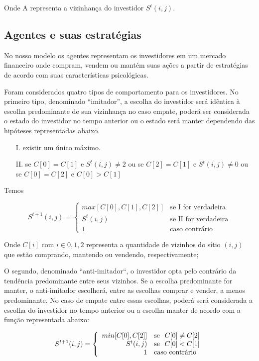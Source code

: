 \documentclass[brazil,ruledheader]{abnt}
\begin{document}
Onde A representa a vizinhança do investidor $S^t(i,j)$.

\subsection{Agentes e suas estratégias}

No nosso modelo os agentes representam os investidores em um mercado financeiro
onde compram, vendem ou mantém suas ações a partir de estratégias de acordo com
suas características psicológicas.

Foram considerados quatro tipos de comportamento para os investidores. No
primeiro tipo, denominado ``imitador'', a escolha do investidor será idêntica
à escolha predominante de sua vizinhança no caso empate, poderá ser
considerada o estado do investidor no tempo anterior ou o estado será 
manter dependendo das hipóteses representadas abaixo.

\begin{enumerate}
 \item[I.] existir um único máximo. 

\item[II.] se $C[0]=C[1]$ e $S^t(i,j)\neq 2$ ou se $C[2]=C[1]$ e $S^t(i,j)\neq
0$ ou se $C[0]=C[2]$ e $C[0]>C[1]$
\end{enumerate}

Temos

\begin{equation}
S^{t+1}(i,j)=\left\{ \begin{array}{rl}
max[C[0],C[1],C[2]] & \mbox{se I for verdadeira} \\
S^t(i,j) & \mbox{se II for verdadeira} \\
1 &  \mbox{caso contrário}
\end{array}\right.
\end{equation}

Onde $C[i]$ com $i \in {0,1,2}$ representa a quantidade de vizinhos do sítio
$(i,j)$ que estão comprando, mantendo ou vendendo, respectivamente;

O segundo, denominado ``anti-imitador``, o investidor opta pelo contrário da
tendência predominante entre seus vizinhos. Se a escolha predominante for
manter, o anti-imitador escolherá, entre as escolhas comprar e vender, a menos
predominante. No caso de empate entre essas escolhas, poderá será considerada a
escolha do investidor no tempo anterior ou a escolha manter de acordo com a
função representada abaixo:

\begin{equation}
S^{t+1}(i,j)=\left\{ \begin{array}{rl}
min[C[0],C[2]] & \mbox{se\hspace{.7em}} C[0] \neq C[2] \\
S^t(i,j) & \mbox{se\hspace{.7em}} C[0]<C[1] \\
1 &  \mbox{caso contrário}
\end{array}\right.
\end{equation}
\end{document}
